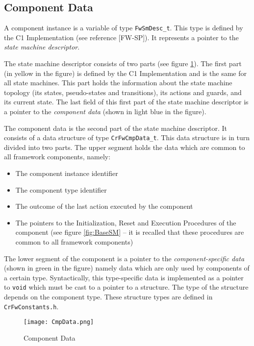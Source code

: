\documentclass{pnp_article}
\begin{document}
\subsection{Component Data}\label{sec:CmpData}
 
A component instance is a variable of type \texttt{FwSmDesc\_t}. This type is defined by the C1 Implementation (see reference [FW-SP]). It represents a pointer to the \textit{state machine descriptor}.

The state machine descriptor consists of two parts (see figure \ref{fig:CmpData}). The first part (in yellow in the figure) is defined by the C1 Implementation and is the same for all state machines. This part holds the information about the state machine topology (its states, pseudo-states and transitions), its actions and guards, and its current state. The last field of this first part of the state machine descriptor is a pointer to the \textit{component data} (shown in light blue in the figure). 

The component data is the second part of the state machine descriptor. It consists of a data structure of type \texttt{CrFwCmpData\_t}. This data structure is in turn divided into two parts. The upper segment holds the data which are common to all framework components, namely:

\begin{itemize}
\item The component instance identifier
\item The component type identifier
\item The outcome of the last action executed by the component
\item The pointers to the Initialization, Reset and Execution Procedures of the component (see figure \ref{fig:BaseSM} -- it is recalled that these procedures are common to all framework components)
\end{itemize}

The lower segment of the component is a pointer to the \textit{component-specific data} (shown in green in the figure) namely data which are only used by components of a certain type. Syntactically, this type-specific data is implemented as a pointer to \texttt{void} which must be cast to a pointer to a structure. The type of the structure depends on the component type. These structure types are defined in \texttt{CrFwConstants.h}.

\begin{figure}[h]
 \centering
 \texttt{[image: CmpData.png]}
 \caption{Component Data}
 \label{fig:CmpData}
\end{figure}
\end{document}
